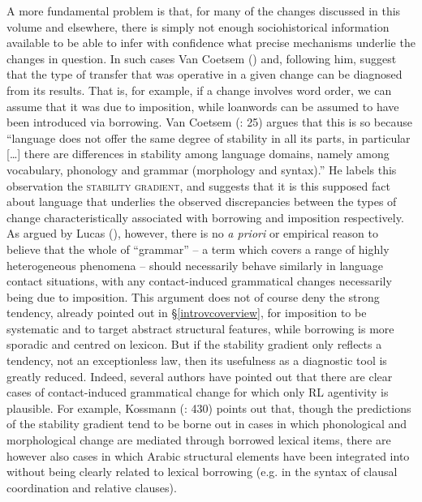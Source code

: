 \documentclass[output=paper]{langsci/langscibook}
\begin{document}
A more fundamental problem is that, for many of the changes discussed in this volume and elsewhere, there is simply not enough sociohistorical information available to be able to infer with confidence what precise mechanisms underlie the changes in question. In such cases Van Coetsem (\citeyear{VanCoetsem1988,VanCoetsem2000}) and, following him, \citet{Winford2005} suggest that the type of transfer that was operative in a given change can be diagnosed from its results. That is, for example, if a change involves word order, we can assume that it was due to imposition, while loanwords can be assumed to have been introduced via borrowing. Van Coetsem (\citeyear{VanCoetsem1988}: 25) argues that this is so because “language does not offer the same
degree of stability in all its parts, in particular […] there are differences in stability
among language domains, namely among vocabulary, phonology and grammar
(morphology and syntax).” He labels this observation the \textsc{stability gradient}, and suggests that it is this supposed fact about language that underlies the observed discrepancies between the types of change characteristically associated with borrowing and imposition respectively. As argued by Lucas (\citeyear{Lucas2012,Lucas2015}), however, there is no \textit{a priori} or empirical reason to believe that the whole of ``grammar'' -- a term which covers a range of highly heterogeneous phenomena -- should necessarily behave similarly in language contact situations, with any contact-induced grammatical changes necessarily being due to imposition. This argument does not of course deny the strong tendency, already pointed out in §\ref{introvcoverview}, for imposition to be systematic and to target abstract structural features, while borrowing is more sporadic and centred on lexicon. But if the stability gradient only reflects a tendency, not an exceptionless law, then its usefulness as a diagnostic tool is greatly reduced. Indeed, several authors have pointed out that there are clear cases of contact-induced grammatical change for which only RL agentivity is plausible. For example, Kossmann (\citeyear{Kossmann2013book}: 430) points out that, though the predictions of the stability gradient tend to be borne out in cases in which phonological and morphological change are mediated through borrowed lexical items, there are however also cases in which Arabic structural elements have been integrated into  without being clearly related to lexical borrowing (e.g. in the syntax of clausal coordination and relative clauses).
\end{document}
